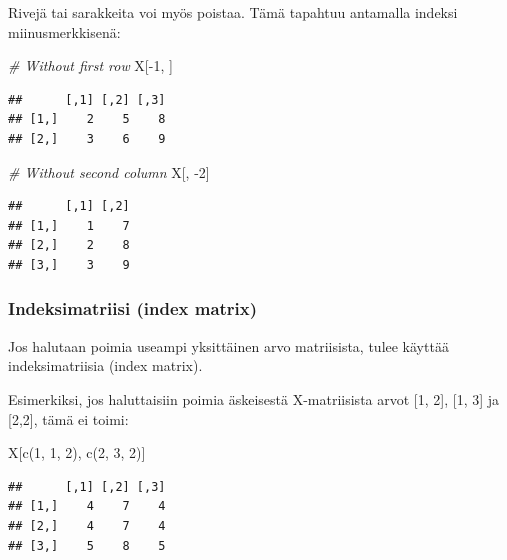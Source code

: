 \documentclass[
]{book}
\newenvironment{Shaded}{\begin{snugshade}}{\end{snugshade}}
\newcommand{\CommentTok}[1]{\textcolor[rgb]{0.56,0.35,0.01}{\textit{#1}}}
\newcommand{\DecValTok}[1]{\textcolor[rgb]{0.00,0.00,0.81}{#1}}
\newcommand{\FunctionTok}[1]{\textcolor[rgb]{0.00,0.00,0.00}{#1}}
\newcommand{\NormalTok}[1]{#1}
\newcommand{\SpecialCharTok}[1]{\textcolor[rgb]{0.00,0.00,0.00}{#1}}
\begin{document}
Rivejä tai sarakkeita voi myös poistaa. Tämä tapahtuu antamalla indeksi miinusmerkkisenä:

\begin{Shaded}
\begin{Highlighting}[]
\CommentTok{\# Without first row}
\NormalTok{X[}\SpecialCharTok{{-}}\DecValTok{1}\NormalTok{, ]}
\end{Highlighting}
\end{Shaded}

\begin{verbatim}
##      [,1] [,2] [,3]
## [1,]    2    5    8
## [2,]    3    6    9
\end{verbatim}

\begin{Shaded}
\begin{Highlighting}[]
\CommentTok{\# Without second column}
\NormalTok{X[, }\SpecialCharTok{{-}}\DecValTok{2}\NormalTok{]}
\end{Highlighting}
\end{Shaded}

\begin{verbatim}
##      [,1] [,2]
## [1,]    1    7
## [2,]    2    8
## [3,]    3    9
\end{verbatim}

\hypertarget{indeksimatriisi-index-matrix}{%
\subsubsection{Indeksimatriisi (index matrix)}\label{indeksimatriisi-index-matrix}}

Jos halutaan poimia useampi yksittäinen arvo matriisista, tulee käyttää indeksimatriisia (index matrix).

Esimerkiksi, jos haluttaisiin poimia äskeisestä X-matriisista arvot {[}1, 2{]}, {[}1, 3{]} ja {[}2,2{]}, tämä ei toimi:

\begin{Shaded}
\begin{Highlighting}[]
\NormalTok{X[}\FunctionTok{c}\NormalTok{(}\DecValTok{1}\NormalTok{, }\DecValTok{1}\NormalTok{, }\DecValTok{2}\NormalTok{), }\FunctionTok{c}\NormalTok{(}\DecValTok{2}\NormalTok{, }\DecValTok{3}\NormalTok{, }\DecValTok{2}\NormalTok{)]}
\end{Highlighting}
\end{Shaded}

\begin{verbatim}
##      [,1] [,2] [,3]
## [1,]    4    7    4
## [2,]    4    7    4
## [3,]    5    8    5
\end{verbatim}
\end{document}
